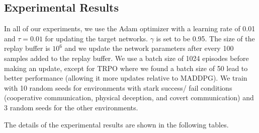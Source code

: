 \documentclass{article}
\newcommand{\cpol}[0]{\pmb{\mu}}
\begin{document}
\iffalse
\begin{algorithm}[H]
 \SetAlgoLined
  \begin{algorithmic}
    \FOR{$\textrm{episode}=1\textrm{ to }M$}
      \FOR{$t=1\textrm{ to max-episode-length}$}
\STATE Select actions $a=(a_1,\ldots,a_N)$ w.r.t.\@ current policy, observe reward $r$ and new state $\mathbf{x}'$
          \STATE Store $(\mathbf{x},a,r,\mathbf{x}')$ in replay buffer $\mathcal{D}$ \FOR{agent $i=1\textrm{ to }N$}
            \STATE Sample a random minibatch of $S$ samples $(\mathbf{x}^j,a^j,r^j,\mathbf{x}'^j)$ from $\mathcal{D}$
            \STATE Set $y^j=r_i^j+\gamma\, Q_i^{\cpol'}(\mathbf{x}'^j,a_1',\ldots,a_N')|_{a_k'=\cpol'_k(o_k^j)}$
            \STATE Update critic by minimizing the loss $\mathcal{L}(\theta_i)=\frac{1}{S}\sum_j\left(y^j-Q_i^{\cpol}(\mathbf{x}^j,a^j_1,\ldots,a^j_N)\right)^2$
            \STATE Update actor using the sampled policy gradient:
            $$
            \nabla_{\theta_i}J\approx\frac{1}{S}\sum_j\nabla_{\theta_i}\cpol_i(o_i^j)\nabla_{a_i}Q_i^{\cpol}(\mathbf{x}^j,a^j_1,\ldots,a_i,\ldots,a^j_N)\big|_{a_i=\cpol_i(o_i^j)}
            $$
          \ENDFOR     
          \STATE Update target network parameters for each agent $i$:
          $$
          \theta_i'\gets\tau\theta_i+(1-\tau)\theta_i'
          $$
      \ENDFOR
    \ENDFOR
  \end{algorithmic}
 \caption{Multi-Agent Deep Deterministic Policy Gradient for $N$ agents}
\end{algorithm}
\fi

\subsection*{Experimental Results}
\label{sec:tables}

In all of our experiments, we use the Adam optimizer with a learning rate of 0.01 and $\tau=0.01$ for updating the target networks. $\gamma$ is set to be 0.95. The size of the replay buffer is $10^6$ and we update the network parameters after every 100 samples added to the replay buffer. We use a batch size of 1024 episodes before making an update, except for TRPO where we found a batch size of 50 lead to better performance (allowing it more updates relative to MADDPG). We train with 10 random seeds for environments with stark success/ fail conditions (cooperative communication, physical deception, and covert communication) and 3 random seeds for the other environments.

The details of the experimental results are shown in the following tables.
\end{document}
